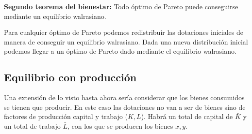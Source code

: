 \textbf{Segundo teorema del bienestar:} Todo óptimo de Pareto puede conseguirse mediante un equilibrio walrasiano. 

Para cualquier óptimo de Pareto podemos redistribuir las dotaciones iniciales de manera de conseguir un equilibrio walrasiano. Dada una nueva distribución inicial podemos llegar a un óptimo de Pareto dado mediante el equilibrio walrasiano. 

\subsection{Equilibrio con producción}

Una extensión de lo visto hasta ahora sería considerar que los bienes consumidos se tienen que producir. En este caso las dotaciones no van a ser de bienes sino de factores de producción capital y trabajo ($K,L$). Habrá un total de capital de $\bar{K}$ y un total de trabajo $\bar{L}$, con los que se producen los bienes $x,y$. 

